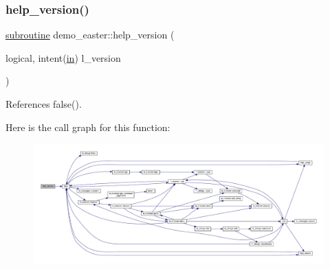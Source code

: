 \subsubsection{\texorpdfstring{help\+\_\+version()}{help\_version()}}
{\footnotesize\ttfamily \hyperlink{M__stopwatch_83_8txt_acfbcff50169d691ff02d4a123ed70482}{subroutine} demo\+\_\+easter\+::help\+\_\+version (\begin{DoxyParamCaption}\item[{logical, intent(\hyperlink{M__journal_83_8txt_afce72651d1eed785a2132bee863b2f38}{in})}]{l\+\_\+version }\end{DoxyParamCaption})}



References false().

Here is the call graph for this function\+:
\nopagebreak
\begin{figure}[H]
\begin{center}
\leavevmode
\includegraphics[width=350pt]{easter_8f90_af4f863a9a969771c1766c7a11ae2ac43_cgraph}
\end{center}
\end{figure}
